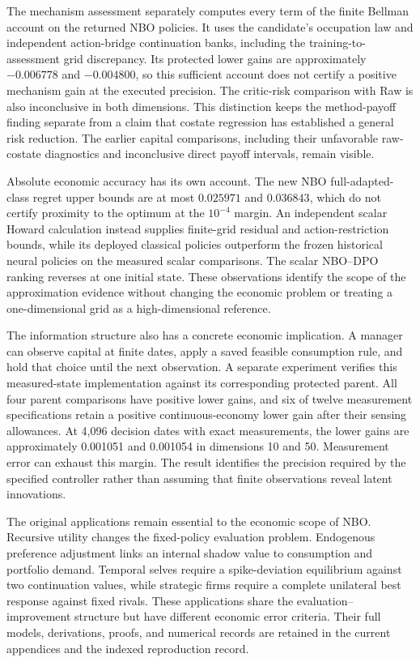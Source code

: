 The mechanism assessment separately computes every term of the finite Bellman account on the returned NBO policies. It uses the candidate's occupation law and independent action-bridge continuation banks, including the training-to-assessment grid discrepancy. Its protected lower gains are approximately $-0.006778$ and $-0.004800$, so this sufficient account does not certify a positive mechanism gain at the executed precision. The critic-risk comparison with Raw is also inconclusive in both dimensions. This distinction keeps the method-payoff finding separate from a claim that costate regression has established a general risk reduction. The earlier capital comparisons, including their unfavorable raw-costate diagnostics and inconclusive direct payoff intervals, remain visible.

Absolute economic accuracy has its own account. The new NBO full-adapted-class regret upper bounds are at most $0.025971$ and $0.036843$, which do not certify proximity to the optimum at the $10^{-4}$ margin. An independent scalar Howard calculation instead supplies finite-grid residual and action-restriction bounds, while its deployed classical policies outperform the frozen historical neural policies on the measured scalar comparisons. The scalar NBO--DPO ranking reverses at one initial state. These observations identify the scope of the approximation evidence without changing the economic problem or treating a one-dimensional grid as a high-dimensional reference.

The information structure also has a concrete economic implication. A manager can observe capital at finite dates, apply a saved feasible consumption rule, and hold that choice until the next observation. A separate experiment verifies this measured-state implementation against its corresponding protected parent. All four parent comparisons have positive lower gains, and six of twelve measurement specifications retain a positive continuous-economy lower gain after their sensing allowances. At 4,096 decision dates with exact measurements, the lower gains are approximately 0.001051 and 0.001054 in dimensions 10 and 50. Measurement error can exhaust this margin. The result identifies the precision required by the specified controller rather than assuming that finite observations reveal latent innovations.

The original applications remain essential to the economic scope of NBO. Recursive utility changes the fixed-policy evaluation problem. Endogenous preference adjustment links an internal shadow value to consumption and portfolio demand. Temporal selves require a spike-deviation equilibrium against two continuation values, while strategic firms require a complete unilateral best response against fixed rivals. These applications share the evaluation--improvement structure but have different economic error criteria. Their full models, derivations, proofs, and numerical records are retained in the current appendices and the indexed reproduction record.
